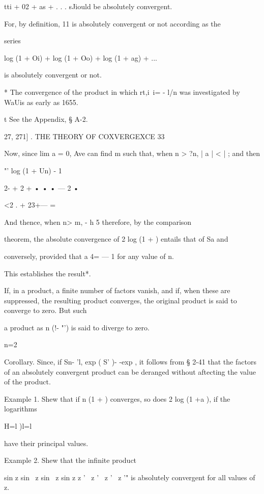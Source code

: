 tti + 02 + as + . . . 
sJiould be absolutely convergent. 

For, by definition, 11 is absolutely convergent or not according as the 

series 

log (1 + Oi) + log (1 + Oo) + log (1 + ag) + ... 

is absolutely convergent or not. 

* The convergence of the product in which rt,i\ i= - l/n  was investigated by WaUis as early 
as 1655. 

t See the Appendix, § A-2. 



27, 271] . THE THEORY OF COXVERGEXCE 33 

Now, since lim a  = 0, Ave can find m such that, when n > ?n, | a  | < | ; and 
then 



  "' log (1 + Un) - 1 



2-  + 2 + • • • — 2 • 



<2 . + 23+--- = 

And thence, when n> m,   -   h 5 therefore, by the comparison 

theorem, the absolute convergence of 2 log (1 +   ) entails that of Sa  and 

conversely, provided that a  4= — 1 for any value of n. 

This establishes the result*. 

If, in a product, a finite number of factors vanish, and if, when these are suppressed, 
the resulting product converges, the original product is said to converge to zero. But such 

a product as n (!- "') is said to diverge to zero. 

n=2 

Corollary. Since, if Sn- 'l, exp ( S' )- -exp  , it follows from § 2-41 that the factors 
of an absolutely convergent product can be deranged without aftecting the value of the 
product. 

Example 1. Shew that if n (1 +  ) converges, so does 2 log (1 +a ), if the logarithms 

H=l )l=l 

have their principal values. 

Example 2. Shew that the infinite product 

sin z sin \ z sin \ z sin  z 
z ' \ z ' \ z ' \ z '" 
is absolutely convergent for all values of z. 

